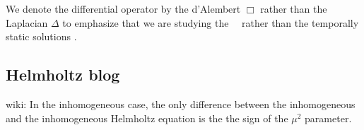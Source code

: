 We denote the differential operator by the d'Alembert $\Box$ rather than
the {Laplacian} $\Delta$  to emphasize that we are
studying the \spt\ \catlatt\ rather than the temporally static solutions
.


\subsection{Helmholtz blog}
\label{sect:HelmBlog}

 {wiki}:
In the inhomogeneous case, the only difference between the inhomogeneous
{\sPe} and the inhomogeneous Helmholtz equation is the the sign of the
${\mu}^2$ parameter.


